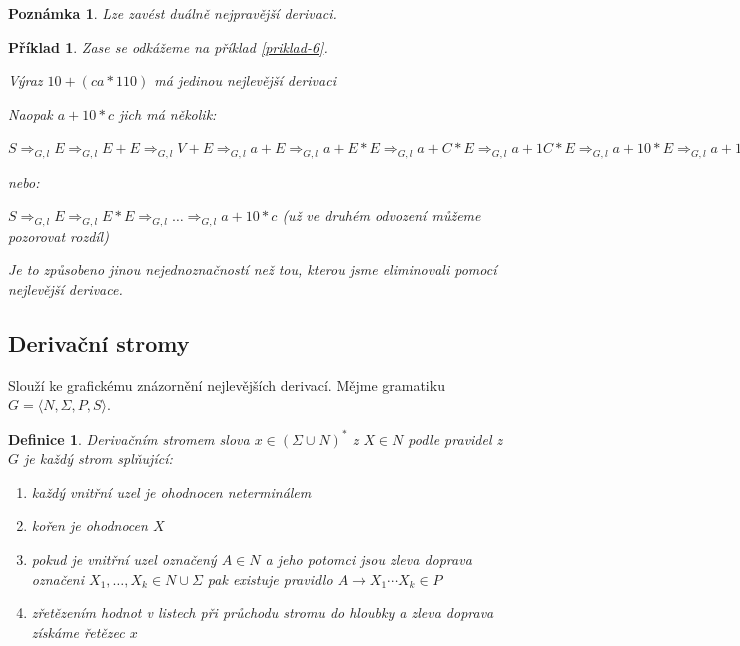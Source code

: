 \documentclass[10pt, a4paper, titlepage]{article}
\theoremstyle{note}
\newtheorem{definice}{\textbf{Definice}}
\newtheorem{priklad}{\textbf{Příklad}}
\newtheorem{poznamka}{\textbf{Poznámka}}
\begin{document}
\begin{poznamka}
Lze zavést duálně nejpravější derivaci.
\end{poznamka}

\begin{priklad}
Zase se odkážeme na příklad \ref{priklad-6}.

Výraz $10+(ca*110)$ má jedinou nejlevější derivaci

Naopak $a+10*c$ jich má několik:

$S \Rightarrow_{G,l} E \Rightarrow_{G,l} E+E \Rightarrow_{G,l} V+E \Rightarrow_{G,l} a+E \Rightarrow_{G,l} a+E*E \Rightarrow_{G,l} a+C*E \Rightarrow_{G,l} a+1C*E \Rightarrow_{G,l} a+10*E \Rightarrow_{G,l} a+10*V \Rightarrow_{G,l} a+10*c$

nebo:

$S \Rightarrow_{G,l} E \Rightarrow_{G,l} E*E \Rightarrow_{G,l} \ldots \Rightarrow_{G,l} a+10*c$ (už ve druhém odvození můžeme pozorovat rozdíl)

Je to způsobeno jinou nejednoznačností než tou, kterou jsme eliminovali pomocí nejlevější derivace.
\end{priklad}

\subsection{Derivační stromy}

Slouží ke grafickému znázornění nejlevějších derivací. Mějme gramatiku $G = \langle N,\Sigma,P,S \rangle$.

\begin{definice}
Derivačním stromem slova $x \in (\Sigma \cup N)^*$ z $X \in N$ podle pravidel z $G$ je každý strom splňující:
\begin{enumerate}
\item 
každý vnitřní uzel je ohodnocen neterminálem
\item
kořen je ohodnocen $X$
\item
pokud je vnitřní uzel označený $A\in N $ a jeho potomci jsou zleva doprava označeni $X_1,\ldots,X_k \in N\cup \Sigma$ pak existuje pravidlo $A \rightarrow X_1 \cdots X_k \in P$
\item
zřetězením hodnot v listech při průchodu stromu do hloubky a zleva doprava získáme řetězec $x$
\end{enumerate}
\end{definice}
\end{document}
